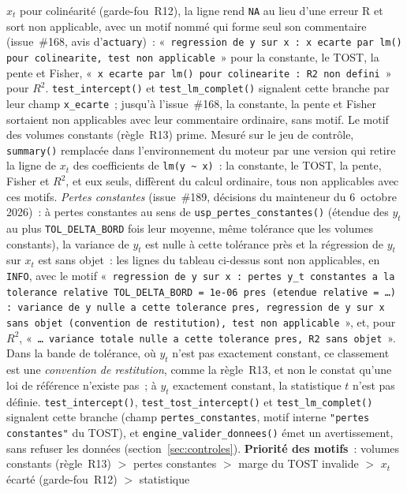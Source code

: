 \documentclass[a4paper,11pt]{article}
\newcommand{\code}[1]{\texttt{\small #1}}
\begin{document}
\begin{itemize}[itemsep=1pt]
  $x_t$ pour colinéarité (garde-fou~R12), la ligne rend \code{NA} au lieu d'une erreur R et sort non
  applicable, avec un motif nommé qui forme seul son commentaire (issue~\#168, avis
  d'\code{actuary})~: «~\code{regression de y sur x : x ecarte par lm() pour colinearite, test non
  applicable}~» pour la constante, le TOST, la pente et Fisher, «~\code{x ecarte par lm() pour
  colinearite : R2 non defini}~» pour $R^2$. \code{test\_intercept()} et
  \code{test\_lm\_complet()} signalent cette branche par leur champ \code{x\_ecarte}~; jusqu'à
  l'issue~\#168, la constante, la pente et Fisher sortaient non applicables avec leur commentaire
  ordinaire, sans motif. Le motif des volumes constants (règle~R13) prime. Mesuré sur le jeu de
  contrôle, \code{summary()} remplacée dans l'environnement du moteur par une version qui retire la
  ligne de $x_t$ des coefficients de \code{lm(y \textasciitilde\ x)}~: la constante, le TOST, la
  pente, Fisher et $R^2$, et eux seuls, diffèrent du calcul ordinaire, tous non applicables avec
  ces motifs. \emph{Pertes constantes} (issue~\#189, décisions du mainteneur du 6~octobre
  2026)~: à pertes constantes au sens de \code{usp\_pertes\_constantes()} (étendue des $y_t$ au
  plus \code{TOL\_DELTA\_BORD} fois leur moyenne, même tolérance que les volumes constants), la
  variance de $y_t$ est nulle à cette tolérance près et la régression de $y_t$ sur $x_t$ est sans
  objet~: les lignes du tableau ci-dessus sont non applicables, en \code{INFO}, avec le motif
  «~\code{regression de y sur x : pertes y\_t constantes a la tolerance relative TOL\_DELTA\_BORD =
  1e-06 pres (etendue relative = \dots) : variance de y nulle a cette tolerance pres, regression de
  y sur x sans objet (convention de restitution), test non applicable}~», et, pour $R^2$,
  «~\code{\dots{} variance totale nulle a cette tolerance pres, R2 sans objet}~». Dans la bande de
  tolérance, où $y_t$ n'est pas exactement constant, ce classement est une \emph{convention de
  restitution}, comme la règle~R13, et non le constat qu'une loi de référence n'existe pas~; à
  $y_t$ exactement constant, la statistique $t$ n'est pas définie. \code{test\_intercept()},
  \code{test\_tost\_intercept()} et \code{test\_lm\_complet()} signalent cette branche
  (champ \code{pertes\_constantes}, motif interne \code{"pertes constantes"} du TOST), et
  \code{engine\_valider\_donnees()} émet un avertissement, sans refuser les données
  (section~\ref{sec:controles}). \textbf{Priorité des motifs}~: volumes constants (règle~R13) $>$
  pertes constantes $>$ marge du TOST invalide $>$ $x_t$ écarté (garde-fou~R12) $>$ statistique

\end{itemize}
\end{document}
